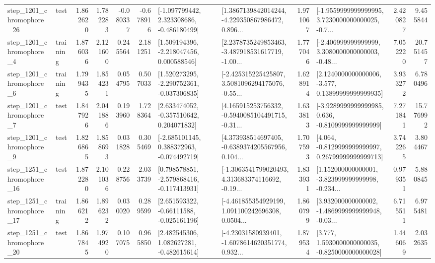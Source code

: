 \begin{tabular}{llrrrrllrlrr}
 step\_1201\_chromophore\_26 &      test &      1.862620 &    1.782283 &     -0.080337 & -0.678916 &   [-1.097799442, 2.323308686, -0.486180499] &  [1.3867139842014244, -4.229350867986472, 0.896... &       1.971067 &  [-1.9559999999999995, 3.7230000000000025, -0.7... &            2.420827 &          9.455844 \\
  step\_1201\_chromophore\_4 &  training &      1.876036 &    2.121600 &      0.245564 &  2.181251 &    [1.509194396, -2.218047456, 0.000588546] &  [2.2378735249853463, -3.487918531617719, -1.00... &       1.777046 &  [-2.406999999999999, 3.3080000000000003, -0.48... &            7.052220 &         20.751457 \\
  step\_1201\_chromophore\_6 &  training &      1.799435 &    1.854231 &      0.054795 &  0.507033 &   [1.520273295, -2.290752361, -0.037306835] &  [-2.425315225425807, 3.5081096294175076, -0.55... &       1.628914 &  [2.1240000000000006, -3.577, 0.13899999999999935] &            3.933272 &          6.780496 \\
  step\_1201\_chromophore\_7 &      test &      1.847926 &    2.041886 &      0.193960 &  1.728364 &    [2.633474052, -0.357510642, 0.204071832] &  [4.165915253756332, -0.5940085104491715, -0.31... &       1.633813 &  [-3.9289999999999985, 0.636, -0.8109999999999999] &            7.271841 &         15.776992 \\
  step\_1201\_chromophore\_9 &      test &      1.826865 &    1.858693 &      0.031828 &  0.305469 &   [-2.685101145, 0.388372963, -0.074492719] &  [4.373938514697405, -0.6389374205567956, 0.104... &       1.707593 &  [4.064, -0.8129999999999997, 0.26799999999999713] &            3.742265 &          3.804467 \\
 step\_1251\_chromophore\_16 &      test &      1.872280 &    2.101036 &      0.228756 &  2.033739 &   [0.798578851, -2.579868416, -0.117413931] &  [-1.3063541799020493, 4.313683374116692, -0.19... &       1.833931 &  [1.152000000000001, -3.823999999999998, -0.234... &            0.979351 &          5.880845 \\
 step\_1251\_chromophore\_17 &  training &      1.866212 &    1.896232 &      0.030020 &  0.289599 &    [2.651593322, -0.66111588, -0.025161196] &  [-4.461855354929199, 1.091100242696308, 0.0504... &       1.860799 &  [3.932000000000002, -1.4869999999999948, -0.03... &            6.715511 &          6.975481 \\
 step\_1251\_chromophore\_20 &      test &      1.867845 &    1.974920 &      0.107075 &  0.965850 &    [2.482545306, 1.082627281, -0.482615614] &  [-4.23031580939401, -1.6078614620351774, 0.932... &       1.879534 &   [3.777, 1.5930000000000035, -0.8250000000000028] &            1.446069 &          2.032635 \\

\end{tabular}
